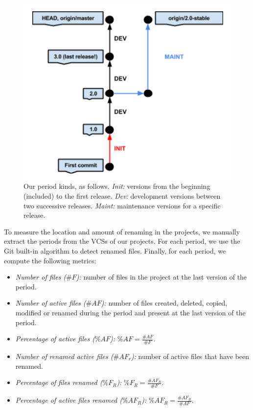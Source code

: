 \begin{figure}[t]
	\centering
	\includegraphics[width=1\linewidth,keepaspectratio]{data/figures/periods.png}
	\caption{Our period kinds, as follows. \emph{Init:} versions from the beginning (included) to the first release. \emph{Dev:} development versions between two successive releases. \emph{Maint:} maintenance versions for a specific release.}
	\label{fig:periods}
\end{figure}

To measure the location and amount of renaming in the projects, we manually extract the periods from the VCSs of our projects. For each period, we use the Git built-in algorithm to detect renamed files. Finally, for each period, we compute the following metrics:

\begin{itemize}
	\item \emph{Number of files ($\#F$):} number of files in the project at the last version of the period.
	\item \emph{Number of active files ($\#AF$):} number of files created, deleted, copied, modified or renamed during the period and present at the last version of the period.
	\item \emph{Percentage of active files ($\%AF$):} $\%AF = \frac{\#AF}{\#F}$.
	\item \emph{Number of renamed active files ($\#AF_{r}$):} number of active files that have been renamed.
	\item \emph{Percentage of files renamed ($\%F_{R}$):} $\%F_{R} = \frac{\#AF_{R}}{\#F}$.
	\item \emph{Percentage of active files renamed ($\%AF_{R}$):} $\%AF_{R} = \frac{\#AF_{R}}{\#AF}$.
\end{itemize}

